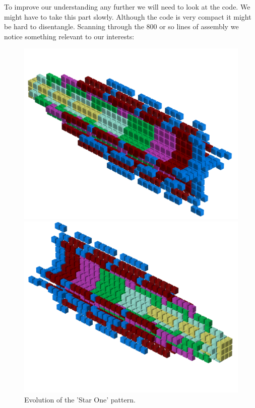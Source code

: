 To improve our understanding any further we will need to look at the code. We might have to take this part slowly.
Although the code is very compact it might be hard to disentangle. Scanning through the 800 or so lines of assembly
we notice something relevant to our interests:

\clearpage
\begin{figure}[H]
    \centering
    \begin{adjustbox}{width=13cm,center}
      \includegraphics[width=12cm]{src/patterns/pattern0-45.png}%
    \end{adjustbox}
    \begin{adjustbox}{width=13cm,margin=0cm -3cm}
      \includegraphics[width=12cm]{src/patterns/pattern0-225.png}%
    \end{adjustbox}
\caption{Evolution of the 'Star One' pattern.}
\end{figure}

